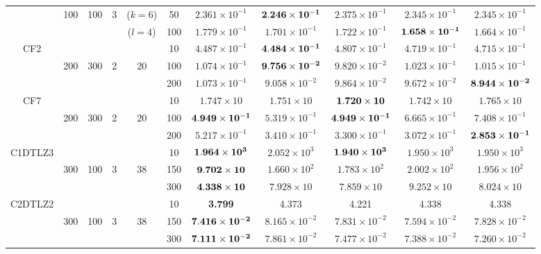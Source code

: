 \documentclass[../main/main]{subfiles}
\begin{document}
\begin{table}[htbp]
\begin{tabular}{c|ccccc|c|c|c|c|c}
  				   &100 & 100 & 3 &  ($k=6$)& 50 &  $ 2.361 \times 10^{-1} $ & $\bf{2.246  \times 10^{-1}}$ & $2.375  \times 10^{-1}$ & $2.345  \times 10^{-1}$ & $2.345  \times 10^{-1}$\\
				   &        &    && ($l=4$)   &100 & $1.779 \times 10^{-1}$ & $1.701 \times 10^{-1}$ & $1.722 \times 10^{-1}$ & $\bf{1.658 \times 10^{-1}}$ & $1.664 \times 10 ^{-1}$\\				   			   
\hline
\multirow{3}{*}{CF2} &        &    &&   & 10 & $4.487 \times 10^{-1}$ & $\bf{4.484 \times 10^{-1}}$ & $4.807 \times 10^{-1}$ & $4.719 \times 10^{-1}$ & $4.715 \times 10^{-1}$\\
  				   &200 & 300 & 2 & 20 & 100 & $1.074 \times 10^{-1}$ & $\bf{9.756 \times 10^{-2}}$ & $9.820 \times 10^{-2}$ & $1.023 \times 10^{-1}$ & $1.015 \times 10^{-1}$\\
				   &   &&     &        &200 & $1.073 \times 10^{-1}$ & $9.058 \times 10^{-2}$ & $9.864 \times 10^{-2}$ & $9.672 \times 10^{-2}$ & $\bf{8.944 \times 10 ^{-2}}$\\
\hline
\multirow{3}{*}{CF7} &   &&     &       & 10 & $1.747 \times 10$ & $1.751 \times 10$ &  $\bf{1.720 \times 10}$ & $1.742 \times 10$ & $1.765 \times 10$\\
  				   &200 & 300 & 2 & 20 & 100 & $\bf{4.949 \times 10^{-1}}$ & $5.319 \times 10^{-1}$ & $\bf{4.949 \times 10^{-1}}$ & $6.665 \times 10^{-1}$ & $7.408 \times 10^{-1}$\\
				   &        &    &&    &200 & $5.217 \times 10^{-1}$ & $3.410 \times 10^{-1}$ & $3.300 \times 10^{-1}$ & $3.072 \times 10^{-1}$ & $\bf{2.853 \times 10 ^{-1}}$\\

\hline
\multirow{3}{*}{C1DTLZ3} &      &&  &     & 10 & $\bf{1.964 \times 10^{3}}$ & $2.052 \times 10^{3}$ &  $\bf{1.940 \times 10^{3}}$ & $1.950 \times 10^{3}$ & $1.950 \times 10^{3}$\\
                                          &300 & 100 & 3 & 38 & 150 & $\bf{9.702 \times 10}$ & $1.660 \times 10^{2}$ &  $1.783 \times 10^{2}$ & $2.002 \times 10^{2}$ & $1.956 \times 10^{2}$\\
				   &        &  &&      &300 &  $\bf{4.338 \times 10}$ & $7.928 \times 10$ &  $7.859 \times 10$ & $9.252 \times 10$ & $8.024 \times 10$\\
\hline
\multirow{3}{*}{C2DTLZ2} &   &&     &       & 10 & \bf{3.799} & 4.373 & 4.221 & 4.338 & 4.338\\
  				   &300 & 100 & 3 & 38 & 150 & $\bf{7.416 \times 10^{-2}}$ & $8.165 \times 10^{-2}$ & $7.831 \times 10^{-2}$ & $7.594 \times 10^{-2}$ & $7.828 \times 10^{-2}$\\
			convex	   &        &    &&    &300  & $\bf{7.111 \times 10^{-2}}$ & $7.861 \times 10^{-2}$ & $7.477 \times 10^{-2}$ & $7.388 \times 10^{-2}$ & $7.260 \times 10^{-2}$\\


\end{tabular}
\end{table}
\end{document}
